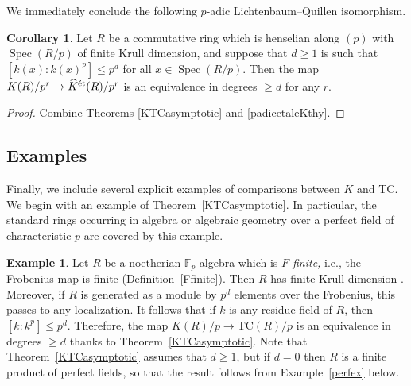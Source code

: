 \documentclass{amsart}
\theoremstyle{definition}
\newtheorem{example}[definition]{Example}
\newtheorem{corollary}[definition]{Corollary}
\newcommand{\sub}[1]{{\mbox{\rm \scriptsize #1}}}
\renewcommand{\hat}{\widehat}
\DeclareMathOperator{\Spec}{Spec}
\newcommand{\TC}{\mathrm{TC}}
\begin{document}
We immediately conclude the following $p$-adic Lichtenbaum--Quillen isomorphism.

\begin{corollary}
Let $R$ be a commutative ring which is henselian along $(p)$ with $\Spec(R/p)$
of finite Krull dimension, and suppose that $d\ge1$ is such that $[k(x): k(x)^p]
\leq p^d$ for all $x\in\Spec (R/p)$. Then the map $K(R)/p^r\to \hat{K}^\sub{\'et}(R)/p^r$ is an equivalence in degrees $\ge d$ for any $r$.
\end{corollary}
\begin{proof}
Combine Theorems \ref{KTCasymptotic} and \ref{padicetaleKthy}.
\end{proof}

\subsection{Examples}
\label{KTCexamples}
Finally, we include several explicit examples of comparisons between $K$ and $ \TC$. 
We begin with an example of Theorem~\ref{KTCasymptotic}. 
In particular, the standard rings occurring in algebra or algebraic geometry
over a perfect field of characteristic $p$ are covered by this example. 
\begin{example} 
Let $R$ be a 
noetherian $\mathbb{F}_p$-algebra
which is \emph{$F$-finite,} i.e., the Frobenius map is finite
(Definition~\ref{Ffinite}). 
Then $R$ has finite Krull dimension \cite[Prop. 1.1]{Kunz}. 
Moreover, if $R$ is generated
as a module by $p^d$ elements over the Frobenius, this passes to any localization. 
It follows that if $k$ is any residue field of $R$, then $[k: k^p] \leq p^d$. 
Therefore, the map $K(R)/p \to \TC(R)/p $ is an equivalence in degrees $\geq d$
thanks to Theorem~\ref{KTCasymptotic}. Note that Theorem~\ref{KTCasymptotic}  
assumes that $d \geq 1$, but if $d = 0$ then $R$ is a finite product of perfect
fields, so that the result   
follows from Example~\ref{perfex} below. 
\end{example} 
\end{document}
